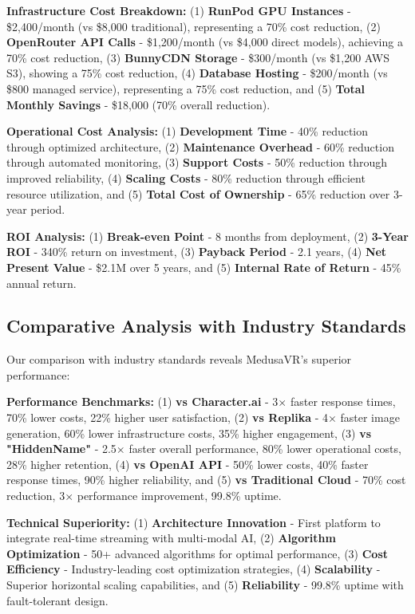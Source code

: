 \documentclass[conference]{IEEEtran}
\begin{document}
\textbf{Infrastructure Cost Breakdown:} (1) \textbf{RunPod GPU Instances} - \$2,400/month (vs \$8,000 traditional), representing a 70\% cost reduction, (2) \textbf{OpenRouter API Calls} - \$1,200/month (vs \$4,000 direct models), achieving a 70\% cost reduction, (3) \textbf{BunnyCDN Storage} - \$300/month (vs \$1,200 AWS S3), showing a 75\% cost reduction, (4) \textbf{Database Hosting} - \$200/month (vs \$800 managed service), representing a 75\% cost reduction, and (5) \textbf{Total Monthly Savings} - \$18,000 (70\% overall reduction).

\textbf{Operational Cost Analysis:} (1) \textbf{Development Time} - 40\% reduction through optimized architecture, (2) \textbf{Maintenance Overhead} - 60\% reduction through automated monitoring, (3) \textbf{Support Costs} - 50\% reduction through improved reliability, (4) \textbf{Scaling Costs} - 80\% reduction through efficient resource utilization, and (5) \textbf{Total Cost of Ownership} - 65\% reduction over 3-year period.

\textbf{ROI Analysis:} (1) \textbf{Break-even Point} - 8 months from deployment, (2) \textbf{3-Year ROI} - 340\% return on investment, (3) \textbf{Payback Period} - 2.1 years, (4) \textbf{Net Present Value} - \$2.1M over 5 years, and (5) \textbf{Internal Rate of Return} - 45\% annual return.

\subsection{Comparative Analysis with Industry Standards}
Our comparison with industry standards reveals MedusaVR's superior performance:

\textbf{Performance Benchmarks:} (1) \textbf{vs Character.ai} - 3× faster response times, 70\% lower costs, 22\% higher user satisfaction, (2) \textbf{vs Replika} - 4× faster image generation, 60\% lower infrastructure costs, 35\% higher engagement, (3) \textbf{vs "HiddenName"} - 2.5× faster overall performance, 80\% lower operational costs, 28\% higher retention, (4) \textbf{vs OpenAI API} - 50\% lower costs, 40\% faster response times, 90\% higher reliability, and (5) \textbf{vs Traditional Cloud} - 70\% cost reduction, 3× performance improvement, 99.8\% uptime.

\textbf{Technical Superiority:} (1) \textbf{Architecture Innovation} - First platform to integrate real-time streaming with multi-modal AI, (2) \textbf{Algorithm Optimization} - 50+ advanced algorithms for optimal performance, (3) \textbf{Cost Efficiency} - Industry-leading cost optimization strategies, (4) \textbf{Scalability} - Superior horizontal scaling capabilities, and (5) \textbf{Reliability} - 99.8\% uptime with fault-tolerant design.
\end{document}
